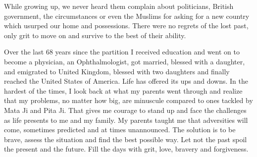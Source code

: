 While growing up, we never heard them complain about politicians, British
government, the circumstances or even the Muslims for asking for a new
country which usurped our home and possessions. There were no regrets of
the lost past, only grit to move on and survive to the best of their
ability. 

Over the last 68 years since the partition I received education and went
on to become a physician, an Ophthalmologist, got married, blessed with
a daughter, and emigrated to United Kingdom, blessed with two daughters
and finally reached the United States of America. Life has offered its ups
and downs. In the hardest of the times, I look back at what my parents
went through and realize that my problems, no matter how big, are
minuscule compared to ones tackled by Mata Ji and Pita Ji. That gives me
courage to stand up and face the challenges as life presents to me and my
family. My parents taught me that adversities will come, sometimes
predicted and at times unannounced. The solution is to be brave, assess
the situation and find the best possible way. Let not the past spoil the
present and the future. Fill the days with grit, love, bravery and
forgiveness. 
